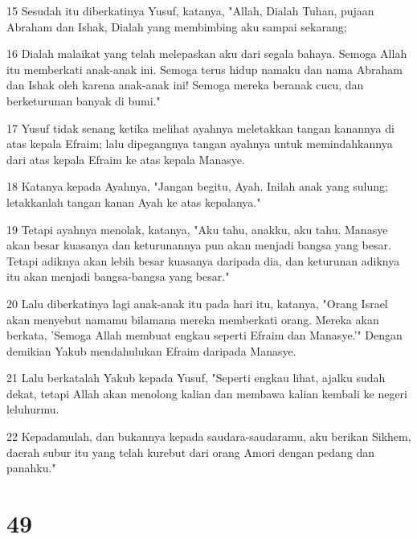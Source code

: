 \par 15 Sesudah itu diberkatinya Yusuf, katanya, "Allah, Dialah Tuhan, pujaan Abraham dan Ishak, Dialah yang membimbing aku sampai sekarang;
\par 16 Dialah malaikat yang telah melepaskan aku dari segala bahaya. Semoga Allah itu memberkati anak-anak ini. Semoga terus hidup namaku dan nama Abraham dan Ishak oleh karena anak-anak ini! Semoga mereka beranak cucu, dan berketurunan banyak di bumi."
\par 17 Yusuf tidak senang ketika melihat ayahnya meletakkan tangan kanannya di atas kepala Efraim; lalu dipegangnya tangan ayahnya untuk memindahkannya dari atas kepala Efraim ke atas kepala Manasye.
\par 18 Katanya kepada Ayahnya, "Jangan begitu, Ayah. Inilah anak yang sulung; letakkanlah tangan kanan Ayah ke atas kepalanya."
\par 19 Tetapi ayahnya menolak, katanya, "Aku tahu, anakku, aku tahu. Manasye akan besar kuasanya dan keturunannya pun akan menjadi bangsa yang besar. Tetapi adiknya akan lebih besar kuasanya daripada dia, dan keturunan adiknya itu akan menjadi bangsa-bangsa yang besar."
\par 20 Lalu diberkatinya lagi anak-anak itu pada hari itu, katanya, "Orang Israel akan menyebut namamu bilamana mereka memberkati orang. Mereka akan berkata, 'Semoga Allah membuat engkau seperti Efraim dan Manasye.'" Dengan demikian Yakub mendahulukan Efraim daripada Manasye.
\par 21 Lalu berkatalah Yakub kepada Yusuf, "Seperti engkau lihat, ajalku sudah dekat, tetapi Allah akan menolong kalian dan membawa kalian kembali ke negeri leluhurmu.
\par 22 Kepadamulah, dan bukannya kepada saudara-saudaramu, aku berikan Sikhem, daerah subur itu yang telah kurebut dari orang Amori dengan pedang dan panahku."

\chapter{49}

